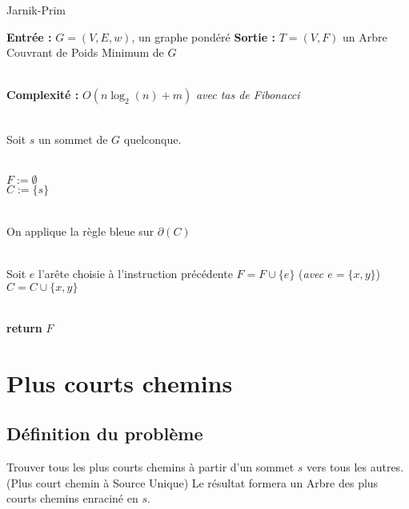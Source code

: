 \documentclass{article}      %
\begin{document}
\begin{algorithm} \caption{Jarnik-Prim}
\begin{algorithmic}

\State \textbf{Entrée :} $G = (V, E, w)$, un graphe pondéré
\State \textbf{Sortie :} $T = (V, F)$ un Arbre Couvrant de Poids Minimum de $G$

\\ \State \textbf{Complexité :} $O(n\log_2(n) + m)$ \textit{avec tas de Fibonacci} 

\\ \State Soit $s$ un sommet de $G$ quelconque.

\\ \State $F := \emptyset$
\\ \State $C := \{s\}$

\\
    \State On applique la règle bleue sur $\partial(C)$
    
    \\ \State Soit $e$ l'arête choisie à l'instruction précédente
    \State $F = F \cup \{e\}$ (\textit{avec $e = \{x, y\}$})
    \State $C = C \cup \{x, y\}$
\EndWhile

\\ \State \textbf{return} $F$
\end{algorithmic}
\end{algorithm}


\section{Plus courts chemins}
\subsection{Définition du problème}
Trouver tous les plus courts chemins à partir d’un sommet $s$ vers tous les autres.
(Plus court chemin à Source Unique)
Le résultat formera un Arbre des plus courts chemins enraciné en $s$.
\end{document}
